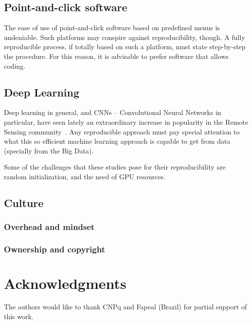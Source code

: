 \documentclass[journal,twoside]{IEEEtran}
\begin{document}
\subsection{Point-and-click software}

The ease of use of point-and-click software based on predefined menus is undeniable.
Such platforms may conspire against reproducibility, though.
A fully reproducible process, if totally based on such a platform, must state step-by-step the procedure.
For this reason, it is advisable to prefer software that allows coding.

\subsection{Deep Learning}

Deep learning in general, and CNNs -- Convolutional Neural Networks in particular, have seen lately an extraordinary increase in popularity in the Remote Sensing community~\cite{DeepLearningandProcessUnderstandingforDataDrivenEarthSystemScience}. 
Any reproducible approach must pay special attention to what this so efficient machine learning approach is capable to get from data (specially from the Big Data).

Some of the challenges that these studies pose for their reproducibility are random initialization, and the need of GPU resources. 

\subsection{Culture}

\subsubsection{Overhead and mindset}

\subsubsection{Ownership and copyright}

	
\section*{Acknowledgments}

The authors would like to thank CNPq and Fapeal (Brazil) for partial support of this work.
	
\nocite{StatisticalAnalysesReproducibleResearch,%
RRComputationalHarmonicAnalysis,%
RREconometrics,%
RRSignalProcessing,%
AddressingNeedDataCodeSharingComputationalScience,%
ReproducibleResearchinComputationalScience,%
TenRulesReproducibleComputationalResearch,%
AddressingNeedDataCodeSharingComputationalScience,
SevenReasonsWhyaUsersGuidetoTransparencyandReproducibility,%
OutoftheBoxReproducibilityaSurveyofMachineLearningPlatforms,%
ReproducibilityofScientificResults2018,%
ReproducibleResearchandGIScienceanEvaluationUsingAGILEConferencePapers,%
TheStateofReproducibilityintheComputationalGeosciences}
	



	
\end{document}
